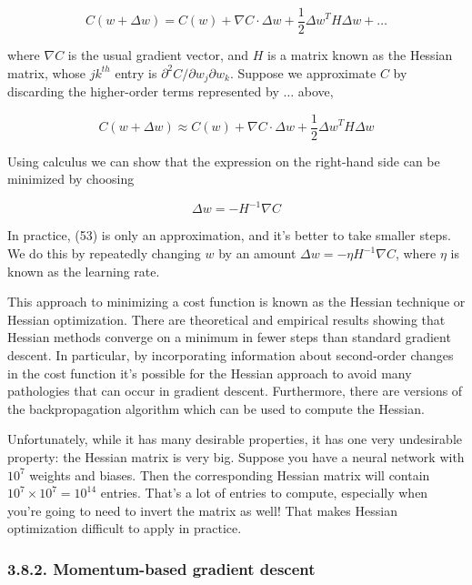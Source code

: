 \documentclass[12 pt]{article}
\begin{document}
\begin{equation}
    C(w + \Delta w) = C(w) + \nabla C \cdot \Delta w +
    \frac{1}{2} {\Delta w}^T H \Delta w + …
\end{equation}

where $ \nabla C $ is the usual gradient vector, and $ H $ is a
matrix known as the Hessian matrix, whose $ jk^{th} $ entry is $
\partial^2 C / \partial w_j \partial w_k $. Suppose we
approximate $ C $ by discarding the higher-order terms
represented by $ \ldots{} $ above,

\begin{equation}
    C(w + \Delta w) \approx C(w) + \nabla C \cdot \Delta w +
    \frac{1}{2} {\Delta w}^T H \Delta w
\end{equation}

Using calculus we can show that the expression on the right-hand side
can be minimized by choosing

\begin{equation}
    \Delta w = −H^{−1} \nabla C
\end{equation}

In practice, (53) is only an approximation, and it's better to take
smaller steps. We do this by repeatedly changing $ w $ by an amount $
\Delta w = -\eta H^{−1} \nabla C $, where $ \eta $ is known as
the learning rate.

This approach to minimizing a cost function is known as the Hessian
technique or Hessian optimization. There are theoretical and empirical
results showing that Hessian methods converge on a minimum in fewer
steps than standard gradient descent. In particular, by incorporating
information about second-order changes in the cost function it's
possible for the Hessian approach to avoid many pathologies that can
occur in gradient descent. Furthermore, there are versions of the
backpropagation algorithm which can be used to compute the Hessian.

Unfortunately, while it has many desirable properties, it has one very
undesirable property: the Hessian matrix is very big. Suppose you have a
neural network with $ 10^7 $ weights and biases. Then the
corresponding Hessian matrix will contain $ 10^7 \times 10^7 =
10^{14} $ entries. That's a lot of entries to compute, especially
when you're going to need to invert the matrix as well! That makes
Hessian optimization difficult to apply in practice.

\subsubsection{3.8.2. Momentum-based gradient descent}
\label{momentum-based-gradient-descent}
\end{document}

